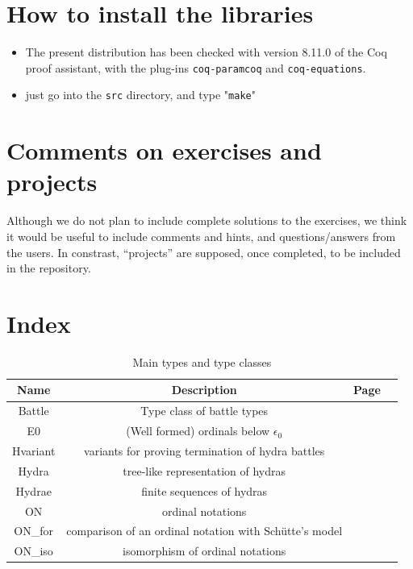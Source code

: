 \documentclass[a4paper]{book}
\begin{document}
{\section{How to install the libraries}
\label{sec:orgheadline4}
\begin{itemize}
\item The present distribution has been checked with version 8.11.0 of the Coq proof assistant, with the plug-ins \texttt{coq-paramcoq} and \texttt{coq-equations}.

\item just go into the \texttt{src} directory, and type "\texttt{make}"
\end{itemize}

\section{Comments on exercises and projects}

Although we do not plan to include complete solutions to the exercises, 
we think it would be useful to include comments and hints, and questions/answers from the users. In constrast, ``projects'' are supposed, once completed, to be included in the repository.




\section{Index}






\begin{table}[h]
  \centering
  \begin{threeparttable}
    \caption{Main types and type classes}
\begin{tabular}{|c|c|c|l|}
\hline
Name & Description& Page \\\hline
Battle & Type class of battle types & \pageref{types:Battle} \\
E0 & (Well formed) ordinals below $\epsilon_0$ & \pageref{types:E0}\\
Hvariant & variants for proving termination of hydra battles & \pageref{sect:hvariant-def} \\
Hydra & tree-like representation of hydras & \pageref{types:Hydra} \\
Hydrae & finite sequences of hydras & \pageref{types:Hydrae} \\
ON & ordinal  notations & \pageref{types:ON} \\
ON\_for & comparison of an ordinal notation with Schütte's model &  \pageref{types:ON-for}\\
ON\_iso & isomorphism of ordinal notations  & \pageref{types:ON-iso}\\


\end{tabular}
\end{threeparttable}
\end{table}}
\end{document}
